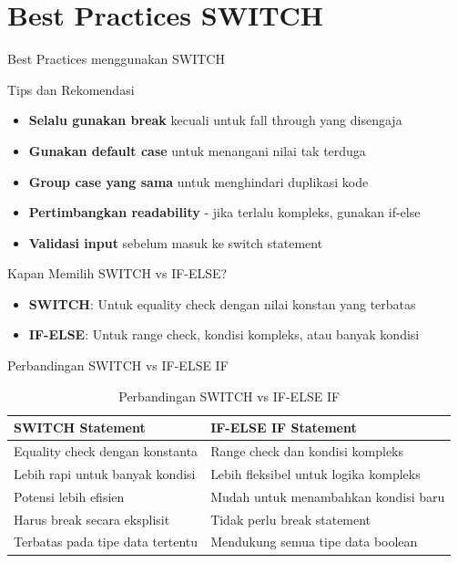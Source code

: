 \documentclass{beamer}
\begin{document}
\section{Best Practices SWITCH}
\begin{frame}{Best Practices menggunakan SWITCH}
  \begin{alertblock}{Tips dan Rekomendasi}
    \begin{itemize}
      \item \textbf{Selalu gunakan break} kecuali untuk fall through yang disengaja
      \item \textbf{Gunakan default case} untuk menangani nilai tak terduga
      \item \textbf{Group case yang sama} untuk menghindari duplikasi kode
      \item \textbf{Pertimbangkan readability} - jika terlalu kompleks, gunakan if-else
      \item \textbf{Validasi input} sebelum masuk ke switch statement
    \end{itemize}
  \end{alertblock}

  \begin{block}{Kapan Memilih SWITCH vs IF-ELSE?}
    \begin{itemize}
      \item \textbf{SWITCH}: Untuk equality check dengan nilai konstan yang terbatas
      \item \textbf{IF-ELSE}: Untuk range check, kondisi kompleks, atau banyak kondisi
    \end{itemize}
  \end{block}
\end{frame}

\begin{frame}{Perbandingan SWITCH vs IF-ELSE IF}
  \begin{table}
    \footnotesize
    \begin{tabular}{p{}|p{}}
    \textbf{SWITCH Statement} & \textbf{IF-ELSE IF Statement} \\
    \hline
    \rowcolor{lightgray}
    Equality check dengan konstanta & Range check dan kondisi kompleks \\
    \rowcolor{white}
    Lebih rapi untuk banyak kondisi & Lebih fleksibel untuk logika kompleks \\
    \rowcolor{lightgray}
    Potensi lebih efisien & Mudah untuk menambahkan kondisi baru \\
    \rowcolor{white}
    Harus break secara eksplisit & Tidak perlu break statement \\
    \rowcolor{lightgray}
    Terbatas pada tipe data tertentu & Mendukung semua tipe data boolean \\
    \end{tabular}
    \caption{Perbandingan SWITCH vs IF-ELSE IF}
  \end{table}
\end{frame}
\end{document}
